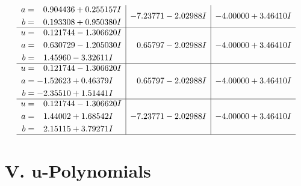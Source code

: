 \documentclass[1p]{elsarticle_modified}
\theoremstyle{definition}
\begin{document}
$$\begin{array}{c|c|c}
\begin{aligned}
a &= \phantom{-}0.904436 + 0.255157 I \\
b &= \phantom{-}0.193308 + 0.950380 I\end{aligned}
 & -7.23771 - 2.02988 I & -4.00000 + 3.46410 I \\ \hline\begin{aligned}
u &= \phantom{-}0.121744 - 1.306620 I \\
a &= \phantom{-}0.630729 - 1.205030 I \\
b &= \phantom{-}1.45960 - 3.32611 I\end{aligned}
 & \phantom{-}0.65797 - 2.02988 I & -4.00000 + 3.46410 I \\ \hline\begin{aligned}
u &= \phantom{-}0.121744 - 1.306620 I \\
a &= -1.52623 + 0.46379 I \\
b &= -2.35510 + 1.51441 I\end{aligned}
 & \phantom{-}0.65797 - 2.02988 I & -4.00000 + 3.46410 I \\ \hline\begin{aligned}
u &= \phantom{-}0.121744 - 1.306620 I \\
a &= \phantom{-}1.44002 + 1.68542 I \\
b &= \phantom{-}2.15115 + 3.79271 I\end{aligned}
 & -7.23771 - 2.02988 I & -4.00000 + 3.46410 I\\
 \hline 
 \end{array}$$\newpage
\newpage\renewcommand{\arraystretch}{1}
\centering \section*{ V. u-Polynomials}
\end{document}

